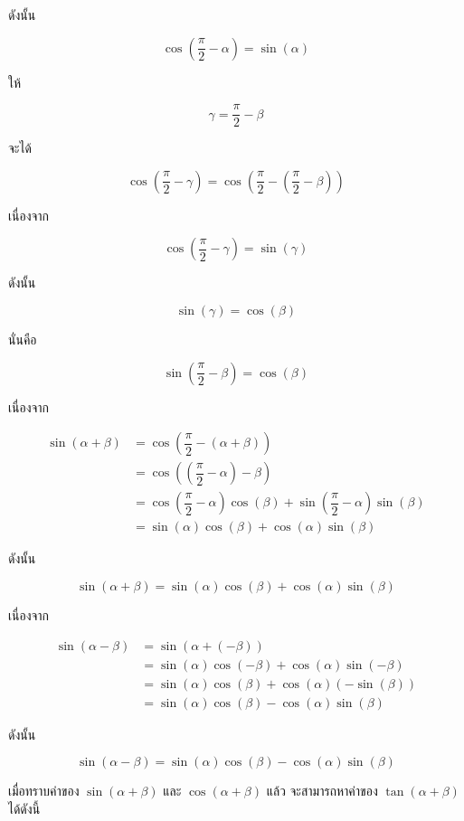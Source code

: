 ดังนั้น

\[
\cos\left(\dfrac{\pi}{2}-\alpha\right)
=
\sin(\alpha)
\]

ให้

\[
\gamma=\dfrac{\pi}{2}-\beta
\]

จะได้

\[
\cos\left(\dfrac{\pi}{2}-\gamma\right)
=
\cos\left(\dfrac{\pi}{2}-\left(\dfrac{\pi}{2}-\beta\right)\right)
\]

เนื่องจาก

\[
\cos\left(\dfrac{\pi}{2}-\gamma\right)
=
\sin(\gamma)
\]

ดังนั้น

\[
\sin(\gamma)
=
\cos(\beta)
\]

นั่นคือ

\[
\sin\left(\dfrac{\pi}{2}-\beta\right)
=
\cos(\beta)
\]

เนื่องจาก

\[
\begin{aligned}
	\sin(\alpha+\beta)
	&=
	\cos\left(\dfrac{\pi}{2}-(\alpha+\beta)\right)
	\\
	&=
	\cos\left(\left(\dfrac{\pi}{2}-\alpha\right)-\beta\right)
	\\
	&=
	\cos\left(\dfrac{\pi}{2}-\alpha\right)\cos(\beta)
	+
	\sin\left(\dfrac{\pi}{2}-\alpha\right)\sin(\beta)
	\\
	&=
	\sin(\alpha)\cos(\beta)
	+
	\cos(\alpha)\sin(\beta)
\end{aligned}
\]

ดังนั้น

\[
\sin(\alpha+\beta)
=
\sin(\alpha)\cos(\beta)
+
\cos(\alpha)\sin(\beta)
\]

\medskip

\noindent เนื่องจาก

\[
\begin{aligned}
	\sin(\alpha-\beta)
	&=
	\sin(\alpha+(-\beta))
	\\
	&=
	\sin(\alpha)\cos(-\beta)
	+
	\cos(\alpha)\sin(-\beta)
	\\
	&=
	\sin(\alpha)\cos(\beta)
	+
	\cos(\alpha)(-\sin(\beta))
	\\
	&=
	\sin(\alpha)\cos(\beta)
	-
	\cos(\alpha)\sin(\beta)
\end{aligned}
\]

ดังนั้น

\[
\sin(\alpha-\beta)
=
\sin(\alpha)\cos(\beta)
-
\cos(\alpha)\sin(\beta)
\]

\vspace{0.5em}
\noindent เมื่อทราบค่าของ $\sin(\alpha+\beta)$ และ $\cos(\alpha+\beta)$ แล้ว จะสามารถหาค่าของ $\tan(\alpha+\beta)$ ได้ดังนี้

